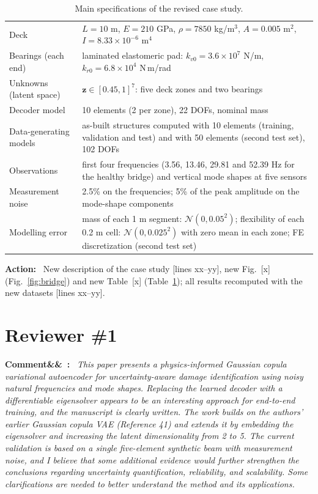 \documentclass[11pt]{article}
\newenvironment{rcomment}[1]{\par\bigskip\noindent\textbf{Comment\ifx&#1&\else\ #1\fi:}\ \itshape}{\par}
\newenvironment{action}{\par\smallskip\noindent\color{resp}\textbf{Action:}\ }{\par}
\newcommand{\tbd}[1]{\textcolor{note}{\textsf{[#1]}}}
\newcommand{\lines}[1]{\tbd{lines #1}}
\newcommand{\z}{\mathbf{z}}
\begin{document}
\begin{table}[H]
\centering\small
\caption{Main specifications of the revised case study.}
\label{tab:specs}
\begin{tabular}{p{3.9cm}p{11cm}}
\toprule
Deck & $L=10$ m, $E=210$ GPa, $\rho=7850$ kg/m$^3$, $A=0.005$ m$^2$, $I=8.33\times10^{-6}$ m$^4$ \\
Bearings (each end) & laminated elastomeric pad: $k_{v0}=3.6\times10^{7}$ N/m, $k_{r0}=6.8\times10^{4}$ N\,m/rad \\
Unknowns (latent space) & $\z\in[0.45,1]^7$: five deck zones and two bearings \\
Decoder model & 10 elements (2 per zone), 22 DOFs, nominal mass \\
Data-generating models & as-built structures computed with 10 elements (training, validation and test) and with 50
elements (second test set), 102 DOFs \\
Observations & first four frequencies (3.56, 13.46, 29.81 and 52.39 Hz for the healthy bridge) and vertical mode
shapes at five sensors \\
Measurement noise & 2.5\% on the frequencies; 5\% of the peak amplitude on the mode-shape components \\
Modelling error & mass of each 1 m segment: $\mathcal{N}(0,0.05^2)$; flexibility of each 0.2 m cell:
$\mathcal{N}(0,0.025^2)$ with zero mean in each zone; FE discretization (second test set) \\
\bottomrule
\end{tabular}
\end{table}

\begin{action}
New description of the case study \lines{xx--yy}, new Fig.~\tbd{x} (Fig.~\ref{fig:bridge}) and new Table~\tbd{x}
(Table~\ref{tab:specs}); all results recomputed with the new datasets \lines{xx--yy}.
\end{action}

\section{Reviewer \#1}

\begin{rcomment}{}
This paper presents a physics-informed Gaussian copula variational autoencoder for uncertainty-aware damage
identification using noisy natural frequencies and mode shapes. Replacing the learned decoder with a differentiable
eigensolver appears to be an interesting approach for end-to-end training, and the manuscript is clearly written. The work
builds on the authors' earlier Gaussian copula VAE (Reference 41) and extends it by embedding the eigensolver and
increasing the latent dimensionality from 2 to 5. The current validation is based on a single five-element synthetic
beam with measurement noise, and I believe that some additional evidence would further strengthen the conclusions
regarding uncertainty quantification, reliability, and scalability. Some clarifications are needed to better understand
the method and its applications.
\end{rcomment}
\end{document}
